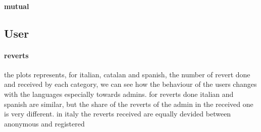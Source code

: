 \paragraph*{mutual}
\subsection{User}
\paragraph*{reverts}
the plots represents, for italian, catalan and spanish, the number of revert done and received by
each category, we can see how the behaviour of the users changes with the languages especially
towards admins. for reverts done italian and spanish are similar, but the share of the reverts of
the admin in the received one is very different. in italy the reverts received are equally devided
between anonymous and registered 
